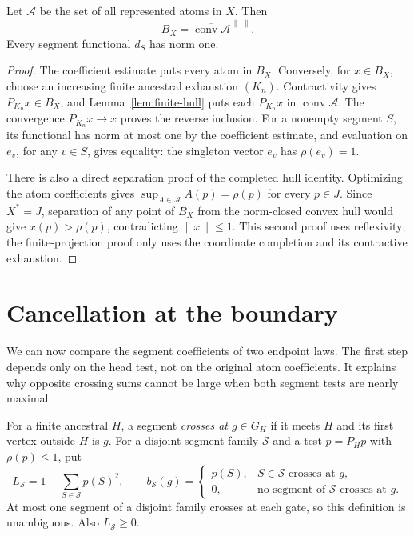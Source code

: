 \begin{corollary}\label{cor:closed-atomic-ball}
Let $\mathcal A$ be the set of all represented atoms in $X$. Then
\[
 B_X=\overline{\operatorname{conv}\mathcal A}^{\,\|\cdot\|}.
\]
Every segment functional $d_S$ has norm one.
\end{corollary}

\begin{proof}
The coefficient estimate puts every atom in $B_X$. Conversely, for
$x\in B_X$, choose an increasing finite ancestral exhaustion $(K_n)$.
Contractivity gives $P_{K_n}x\in B_X$, and
Lemma~\ref{lem:finite-hull} puts each $P_{K_n}x$ in
$\operatorname{conv}\mathcal A$. The convergence
$P_{K_n}x\to x$ proves the reverse inclusion. For a nonempty segment
$S$, its functional has norm at most one by the coefficient estimate,
and evaluation on $e_v$, for any $v\in S$, gives equality: the singleton
vector $e_v$ has $\rho(e_v)=1$.

There is also a direct separation proof of the completed hull identity.
Optimizing the atom coefficients gives
$\sup_{A\in\mathcal A}A(p)=\rho(p)$ for every $p\in J$.
Since $X^*=J$, separation of any point of $B_X$ from the norm-closed
convex hull would give $x(p)>\rho(p)$, contradicting $\|x\|\le1$.
This second proof uses reflexivity; the finite-projection proof only
uses the coordinate completion and its contractive exhaustion.
\end{proof}

\section{Cancellation at the boundary}\label{sec:cancellation}

We can now compare the segment coefficients of two endpoint laws. The
first step depends only on the head test, not on the original atom
coefficients. It explains why opposite crossing sums cannot be large
when both segment tests are nearly maximal.

For a finite ancestral $H$, a segment \emph{crosses at $g\in G_H$} if
it meets $H$ and its first vertex outside $H$ is $g$. For a disjoint
segment family $\mathcal S$ and a test $p=P_Hp$ with $\rho(p)\le1$,
put
\[
 L_{\mathcal S}=1-\sum_{S\in\mathcal S}p(S)^2,\qquad
 b_{\mathcal S}(g)=
 \begin{cases}
 p(S),&S\in\mathcal S\text{ crosses at }g,\\
 0,&\text{no segment of }\mathcal S\text{ crosses at }g.
 \end{cases}
\]
At most one segment of a disjoint family crosses at each gate, so this
definition is unambiguous. Also $L_{\mathcal S}\ge0$.

